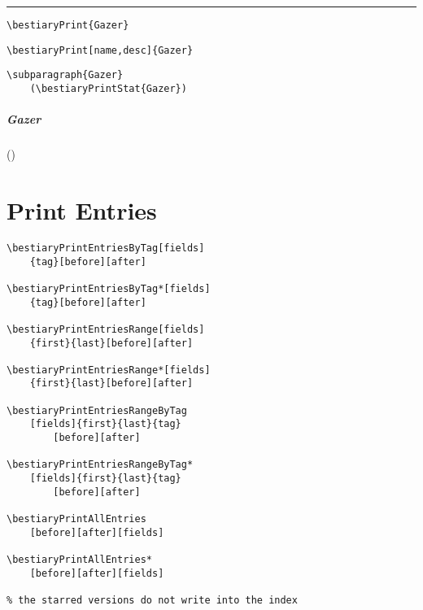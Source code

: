 \documentclass[itdr]{subfiles}
\begin{document}
\skipline
\hrule
\vfill

\begin{lstlisting}
\bestiaryPrint{Gazer}
\end{lstlisting}


\vfill

\begin{lstlisting}
\bestiaryPrint[name,desc]{Gazer}
\end{lstlisting}


\vfill

\begin{lstlisting}
\subparagraph{Gazer}
	(\bestiaryPrintStat{Gazer})
\end{lstlisting}

\subparagraph{Gazer} ()

\vfill
\break

\section{Print Entries}

\begin{lstlisting}
\bestiaryPrintEntriesByTag[fields]
	{tag}[before][after]

\bestiaryPrintEntriesByTag*[fields]
	{tag}[before][after]

\bestiaryPrintEntriesRange[fields]
	{first}{last}[before][after]

\bestiaryPrintEntriesRange*[fields]
	{first}{last}[before][after]

\bestiaryPrintEntriesRangeByTag
	[fields]{first}{last}{tag}
		[before][after]

\bestiaryPrintEntriesRangeByTag*
	[fields]{first}{last}{tag}
		[before][after]

\bestiaryPrintAllEntries
	[before][after][fields]

\bestiaryPrintAllEntries*
	[before][after][fields]

% the starred versions do not write into the index
\end{lstlisting}

\begin{comment}
\subsection{By Tag (monster)}

\begin{lstlisting}
\bestiaryPrintEntriesByTag{monster}
	[][\vfill]
\end{lstlisting}

\bestiaryPrintEntriesByTag{monster}[][\vfill]
\end{comment}
\end{document}
